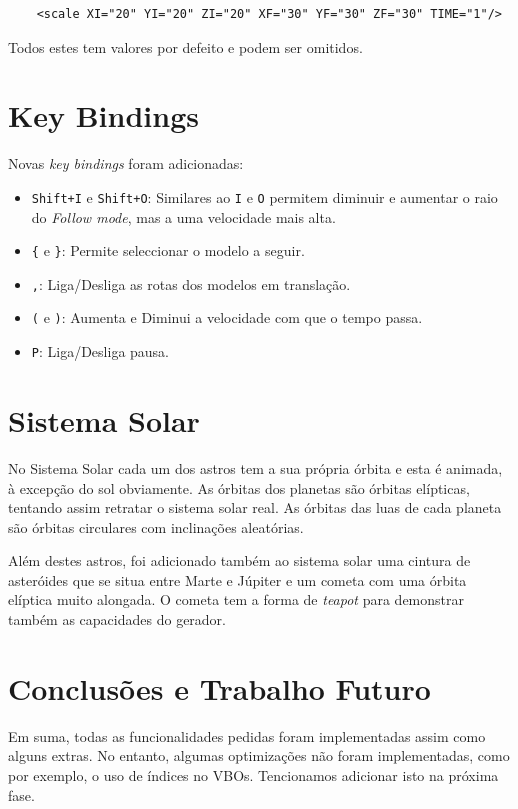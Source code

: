 \documentclass[a4paper]{article}
\begin{document}
\begin{verbatim}
    <scale XI="20" YI="20" ZI="20" XF="30" YF="30" ZF="30" TIME="1"/>
\end{verbatim}

Todos estes tem valores por defeito e podem ser omitidos.

\section{Key Bindings}

Novas \textit{key bindings} foram adicionadas:

\begin{itemize}
    \item \texttt{Shift+I} e \texttt{Shift+O}: Similares ao \texttt{I} e
        \texttt{O} permitem diminuir e aumentar o raio do \textit{Follow mode},
        mas a uma velocidade mais alta.
    \item \verb!{! e \verb!}!: Permite seleccionar o modelo a seguir.
    \item \texttt{,}: Liga/Desliga as rotas dos modelos em translação.
    \item \verb!(! e \verb!)!: Aumenta e Diminui a velocidade com que o tempo
        passa.
    \item \texttt{P}: Liga/Desliga pausa.
\end{itemize}

\section{Sistema Solar}

No Sistema Solar cada um dos astros tem a sua própria órbita e esta é animada, à excepção do sol obviamente.
As órbitas dos planetas são órbitas elípticas, tentando assim retratar o sistema solar real. As órbitas das luas de cada planeta são órbitas circulares com inclinações aleatórias.

Além destes astros, foi adicionado também ao sistema solar uma cintura de asteróides que se situa entre Marte e Júpiter e um cometa com uma órbita elíptica muito alongada. O cometa tem a forma de \textit{teapot} para demonstrar também as capacidades do gerador.

\section{Conclusões e Trabalho Futuro}

Em suma, todas as funcionalidades pedidas foram implementadas assim como alguns extras. No entanto, algumas optimizações não foram implementadas, como por exemplo, o uso de índices no VBOs. Tencionamos adicionar isto na próxima fase.
\end{document}
